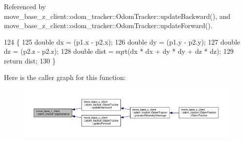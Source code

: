 Referenced by move\+\_\+base\+\_\+z\+\_\+client\+::odom\+\_\+tracker\+::\+Odom\+Tracker\+::update\+Backward(), and move\+\_\+base\+\_\+z\+\_\+client\+::odom\+\_\+tracker\+::\+Odom\+Tracker\+::update\+Forward().


\begin{DoxyCode}
124 \{
125     \textcolor{keywordtype}{double} dx = (p1.x - p2.x);
126     \textcolor{keywordtype}{double} dy = (p1.y - p2.y);
127     \textcolor{keywordtype}{double} dz = (p2.z - p2.z);
128     \textcolor{keywordtype}{double} dist = sqrt(dx * dx + dy * dy + dz * dz);
129     \textcolor{keywordflow}{return} dist;
130 \}
\end{DoxyCode}


Here is the caller graph for this function\+:\nopagebreak
\begin{figure}[H]
\begin{center}
\leavevmode
\includegraphics[width=350pt]{namespacemove__base__z__client_1_1odom__tracker_a4437fd4b6bf9ca87f5b806ad408fb430_icgraph}
\end{center}
\end{figure}


